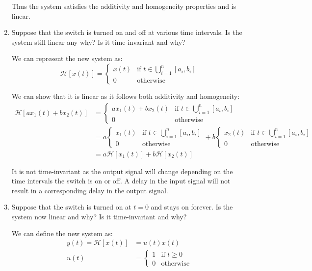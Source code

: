 \documentclass{article}
\begin{document}
\begin{enumerate}[label=5.\arabic*]
    Thus the system satisfies the additivity and homogeneity properties and is linear.

    \item Suppose that the switch is turned on and off at various time intervals. Is the system still linear any why? Is it time-invariant and why?

    We can represent the new system as:
    \[
        \mathcal{H}[x(t)] =\begin{cases}
        x(t) & \text{if } t \in \bigcup_{i=1}^{n} [a_i, b_i] \\
        0 & \text{otherwise}
        \end{cases}
    \]

    We can show that it is linear as it follows both additivity and homogeneity:
    \begin{align*}
        \mathcal{H}[ax_1(t) +bx_2(t)] &= \begin{cases}
            ax_1(t) + bx_2(t) & \text{if } t \in \bigcup_{i=1}^{n} [a_i, b_i] \\
            0 & \text{otherwise}
        \end{cases} \\
        &= a\begin{cases}
            x_1(t) & \text{if } t \in \bigcup_{i=1}^{n} [a_i, b_i] \\
            0 & \text{otherwise}
        \end{cases} + b\begin{cases}
            x_2(t) & \text{if } t \in \bigcup_{i=1}^{n} [a_i, b_i] \\
            0 & \text{otherwise}
        \end{cases} \\
        &= a\mathcal{H}[x_1(t)] + b\mathcal{H}[x_2(t)]
    \end{align*}

    It is not time-invariant as the output signal will change depending on the time intervals the switch is on or off. A delay in the input signal will not result in a corresponding delay in the output signal.

    \item Suppose that the switch is turned on at $t=0$ and stays on forever. Is the system now linear and why? Is it time-invariant and why?

    We can define the new system as:
    \begin{align*}
        y(t) = \mathcal{H}[x(t)] &= u(t)x(t) \\
        u(t) &= \begin{cases}
            1 & \text{if } t \geq 0 \\
            0 & \text{otherwise}
        \end{cases}
    \end{align*}


\end{enumerate}
\end{document}
